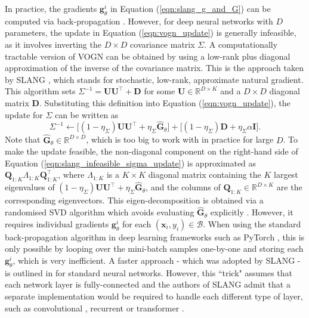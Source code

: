 \documentclass[msc,deptreport.inf]{infthesis} %
\newcommand{\matr}[1]{\mathbf{#1}}
\newcommand{\R}{\mathbb R}
\begin{document}
In practice, the gradients $\matr{g}_\theta^i$ in Equation (\ref{eqn:slang_g_and_G}) can be computed via back-propagation \cite{rumelhart1986}. However, for deep neural networks with $D$ parameters, the update in Equation (\ref{eqn:vogn_update}) is generally infeasible, as it involves inverting the $D \times D$ covariance matrix $\Sigma$. A computationally tractable version of VOGN can be obtained by using a low-rank plus diagonal approximation of the inverse of the covariance matrix. This is the approach taken by SLANG \cite{mishkin2018}, which stands for stochastic, low-rank, approximate natural gradient. This algorithm sets $\Sigma^{-1} = \matr{U} \matr{U}^\intercal + \matr{D}$ for some $\matr{U} \in \R^{D \times K}$ and a $D \times D$ diagonal matrix $\matr{D}$. Substituting this definition into Equation (\ref{eqn:vogn_update}), the update for $\Sigma$ can be written as
\begin{equation}\label{eqn:slang_infeasible_sigma_update}
	\Sigma^{-1} \leftarrow 
	\big[(1 - \eta_\Sigma) \matr{U} \matr{U}^\intercal + \eta_\Sigma \hat{\matr{G}}_\theta \big] 
	+ \big[(1 - \eta_\Sigma) \matr{D} + \eta_\Sigma \alpha \matr{I}\big].
\end{equation}
Note that $\hat{\matr{G}}_\theta \in \R^{D\times D}$, which is too big to work with in practice for large $D$. To make the update feasible, 
the non-diagonal component on the right-hand side of Equation (\ref{eqn:slang_infeasible_sigma_update}) is approximated as $\matr{Q}_{1:K} \Lambda_{1:K} \matr{Q}_{1:K}^\intercal$, where $\Lambda_{1:K}$ is a $K \times K$ diagonal matrix containing the $K$ largest eigenvalues of $(1 - \eta_\Sigma) \matr{U} \matr{U}^\intercal + \eta_\Sigma \hat{\matr{G}}_\theta$, and the columns of $\matr{Q}_{1:K} \in \R^{D \times K}$ are the corresponding eigenvectors. This eigen-decomposition is obtained via a randomised SVD algorithm which avoids evaluating $\hat{\matr{G}}_\theta$ explicitly \cite{mishkin2018}. However, it requires individual gradients $\matr{g}_\theta^i$ for each  $(\matr{x}_i, y_i) \in \mathcal{B}$. When using the standard back-propagation algorithm in deep learning frameworks such as PyTorch \cite{paszke2019}, this is only possible by looping over the mini-batch samples one-by-one and storing each $\matr{g}_\theta^i$, which is very inefficient. A faster approach - which was adopted by SLANG - is outlined in \cite{goodfellow2015} for standard neural networks. However, this ``trick" assumes that each network layer is fully-connected and the authors of SLANG admit that a separate implementation would be required to handle each different type of layer, such as convolutional \cite{krizhevsky09}, recurrent \cite{hochreiter1997} or transformer \cite{vaswani2017}.
\end{document}
